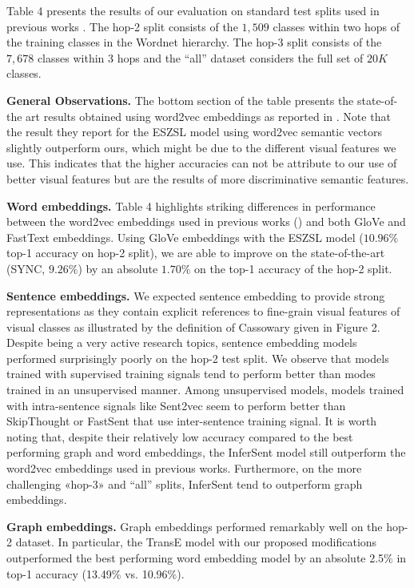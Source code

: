 Table 4 presents the results of our evaluation on standard test splits used in previous works \cite{kodirov2017semantic,xian2017zero,frome2013devise,changpinyo2016synthesized,norouzi2013zero}. The hop-2 split consists of the $1,509$ classes within two hops of the training classes in the Wordnet hierarchy. The hop-3 split consists of the $7,678$ classes within 3 hops and the ``all'' dataset considers the full set of $20K$ classes.

\textbf{General Observations.} The bottom section of the table presents the state-of-the art results obtained using word2vec embeddings as reported in \cite{xian2017zero}. Note that the result they report for the ESZSL model using word2vec semantic vectors slightly outperform ours, which might be due to the different visual features we use. This indicates that the higher accuracies can not be attribute to our use of better visual features but are the results of more discriminative semantic features.


\textbf{Word embeddings.} Table 4 highlights striking differences in performance between the word2vec embeddings used in previous works (\cite{kodirov2017semantic,xian2017zero,frome2013devise,changpinyo2016synthesized,norouzi2013zero}) and both GloVe and FastText embeddings. Using GloVe embeddings with the ESZSL model ($10.96\%$ top-1 accuracy on hop-2 split), we are able to improve on the state-of-the-art (SYNC, $9.26\%$) by an absolute $1.70\%$ on the top-1 accuracy of the hop-2 split.

\textbf{Sentence embeddings.} We expected sentence embedding to provide strong representations as they contain explicit references to fine-grain visual features of visual classes as illustrated by the definition of Cassowary given in Figure 2. Despite being a very active research topics, sentence embedding models performed surprisingly poorly on the hop-2 test split. We observe that models trained with supervised training signals tend to perform better than modes trained in an unsupervised manner. Among unsupervised models, models trained with intra-sentence signals like Sent2vec seem to perform better than SkipThought or FastSent that use inter-sentence training signal. It is worth noting that, despite their relatively low accuracy compared to the best performing graph and word embeddings, the InferSent model still outperform the word2vec embeddings used in previous works. Furthermore, on the more challenging «hop-3» and ``all'' splits, InferSent tend to outperform graph embeddings. 

\textbf{Graph embeddings.} Graph embeddings performed remarkably well on the hop-2 dataset. In particular, the TransE model with our proposed modifications outperformed the best performing word embedding model by an absolute 2.5\% in top-1 accuracy (13.49\% vs. 10.96\%). 

